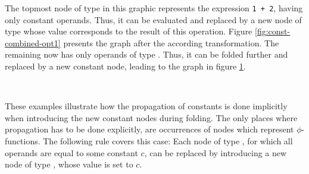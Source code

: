 The topmost node of type  in this graphic represents the expression \lstinline!1 + 2!, having only constant operands. Thus, it can be evaluated and replaced by a new node of type  whose value corresponds to the result of this operation. Figure \ref{fig:const-combined-opt1} presents the graph after the according transformation. The remaining  now has only operands of type . Thus, it can be folded further and replaced by a new constant node, leading to the graph in figure \ref{fig:const-combined-opt2}.

\vspace{3pt}
\begin{figure}[H]
\begin{minipage}[b]{0.5\textwidth}
\centering
{}
\caption{}
\label{fig:const-combined-opt1}
\end{minipage}
~
\begin{minipage}[b]{0.5\textwidth}
\centering
{}
\caption{}
\label{fig:const-combined-opt2}
\end{minipage}
\end{figure}

These examples illustrate how the propagation of constants is done implicitly when introducing the new constant nodes during folding. The only places where propagation has to be done explicitly, are occurrences of nodes which represent $\phi$-functions. The following rule covers this case: Each node of type , for which all operands are equal to some constant $c$, can be replaced by introducing a new node of type , whose value is set to $c$.

